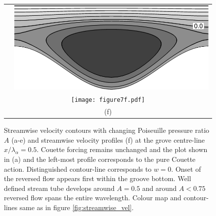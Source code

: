 \documentclass[lineno]{jfm}
\begin{document}
\begin{figure}
\begin{tabular}{cc}
    &
    \includegraphics[width=\wgh]{figure7e.png} \\
    \multicolumn{2}{c}{\texttt{[image: figure7f.pdf]}} \\
    \multicolumn{2}{c}{(f)} \\
\end{tabular}
%  
\caption{Streamwise velocity contours with changing Poiseuille pressure ratio $A$ (a-e) and streamwise velocity profiles (f) at the grove centre-line $x/\lambda_\alpha=0.5$.
Couette forcing remains unchanged and the plot shown in (a) and the left-most profile corresponds to the pure Couette action.
Distinguished contour-line corresponds to $w=0$.
Onset of the reversed flow appears first within the groove bottom. Well defined stream tube develops around $A=0.5$ and around $A<0.75$ reversed flow spans the entire wavelength.
Colour map and contour-lines same as in figure \ref{fig:streamwise_vel}.
}
 \label{fig:streamwise_prof_A}
\end{figure}

\end{document}
